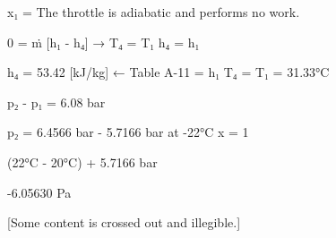 x₁ =  
The throttle is adiabatic and performs no work.  

0 = ṁ [h₁ - h₄] → T₄ = T₁  
h₄ = h₁  

h₄ = 53.42 [kJ/kg] ← Table A-11 = h₁  
T₄ = T₁ = 31.33°C  

p₂ - p₁ = 6.08 bar  

p₂ = 6.4566 bar - 5.7166 bar  
at -22°C  
x = 1  

(22°C - 20°C) + 5.7166 bar  

-6.05630 Pa  

[Some content is crossed out and illegible.]